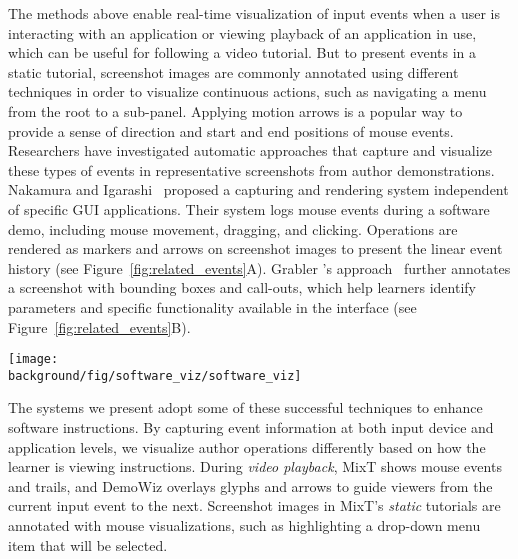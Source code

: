 The methods above enable real-time visualization of input events when a user is interacting with an application or viewing playback of an application in use, which can be useful for following a video tutorial.
%
But to present events in a static tutorial, screenshot images are commonly annotated using different techniques in order to visualize continuous actions, such as navigating a menu from the root to a sub-panel. Applying motion arrows is a popular way to provide a sense of direction and start and end positions of mouse events.
%
Researchers have investigated automatic approaches that capture and visualize these types of events in representative screenshots from author demonstrations. Nakamura and Igarashi~\cite{Nakamura:2008:ASV:1449715.1449721} proposed a capturing and rendering system independent of specific GUI applications. Their system logs mouse events during a software demo, including mouse movement, dragging, and clicking. Operations are rendered as markers and arrows on screenshot images to present the linear event history (see Figure~\ref{fig:related_events}A).
%
Grabler \ea{}'s approach~\cite{Grabler:2009jj} further annotates a screenshot with bounding boxes and call-outs, which help learners identify parameters and specific functionality available in the interface (see Figure~\ref{fig:related_events}B).

\begin{figure*}[t!]
  \centering
  \texttt{[image: \\background/fig/software\_viz/software\_viz]}
  \caption{Examples where software operations are automatically rendered on top of application screenshots, including moving the mouse, dragging, clicking, and scrolling by Nakamura and Igarashi~\cite{Nakamura:2008:ASV:1449715.1449721} (A) and application-specific operations (a-b), parameter setting (c-f), and image manipulations (g-f) by Grabler \ea{}~\cite{Grabler:2009jj} (B).}
  \label{fig:related_events}
\end{figure*}

The systems we present adopt some of these successful techniques to enhance software instructions. By capturing event information at both input device and application levels, we visualize author operations differently based on how the learner is viewing instructions.
%
During \emph{video playback}, MixT shows mouse events and trails, and DemoWiz overlays glyphs and arrows to guide viewers from the current input event to the next.
%
Screenshot images in MixT's \emph{static} tutorials are annotated with mouse visualizations, such as highlighting a drop-down menu item that will be selected.


